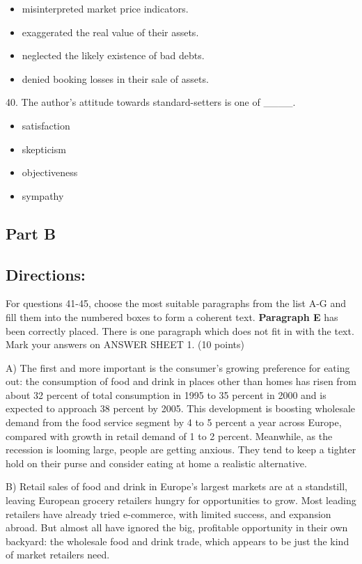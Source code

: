 \documentclass[UTF8,11pt]{ctexart}
\begin{document}
\begin{itemize}[leftmargin=2em,itemsep=.2em,topsep=.4em]\item[A.] misinterpreted market price indicators.
\item[B.] exaggerated the real value of their assets.
\item[C.] neglected the likely existence of bad debts.
\item[D.] denied booking losses in their sale of assets.
\end{itemize}

40. The author’s attitude towards standard-setters is one of \_\_\_\_.


\begin{itemize}[leftmargin=2em,itemsep=.2em,topsep=.4em]\item[A.] satisfaction
\item[B.] skepticism
\item[C.] objectiveness
\item[D.] sympathy
\end{itemize}

\subsection*{\textbf{Part B}}


\subsection*{\textbf{Directions:}}


For questions 41-45, choose the most suitable paragraphs from the list A-G and fill them into the numbered boxes to form a coherent text. \textbf{Paragraph E} has been correctly placed. There is one paragraph which does not fit in with the text. Mark your answers on ANSWER SHEET 1. (10 points)


A) The first and more important is the consumer’s growing preference for eating out: the consumption of food and drink in places other than homes has risen from about 32 percent of total consumption in 1995 to 35 percent in 2000 and is expected to approach 38 percent by 2005. This development is boosting wholesale demand from the food service segment by 4 to 5 percent a year across Europe, compared with growth in retail demand of 1 to 2 percent. Meanwhile, as the recession is looming large, people are getting anxious. They tend to keep a tighter hold on their purse and consider eating at home a realistic alternative.


B) Retail sales of food and drink in Europe’s largest markets are at a standstill, leaving European grocery retailers hungry for opportunities to grow. Most leading retailers have already tried e-commerce, with limited success, and expansion abroad. But almost all have ignored the big, profitable opportunity in their own backyard: the wholesale food and drink trade, which appears to be just the kind of market retailers need.
\end{document}
